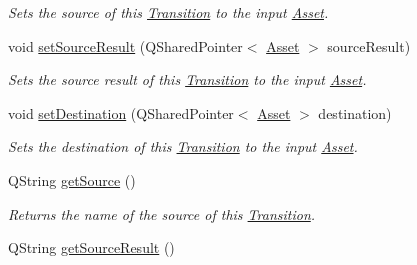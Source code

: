 \begin{DoxyCompactItemize}
\begin{DoxyCompactList}\small\item\em Sets the source of this \hyperlink{class_picto_1_1_transition}{Transition} to the input \hyperlink{class_picto_1_1_asset}{Asset}. \end{DoxyCompactList}\item 
\hypertarget{class_picto_1_1_transition_a9a7d262df965e6324af5e6857fe8347d}{void \hyperlink{class_picto_1_1_transition_a9a7d262df965e6324af5e6857fe8347d}{set\-Source\-Result} (Q\-Shared\-Pointer$<$ \hyperlink{class_picto_1_1_asset}{Asset} $>$ source\-Result)}\label{class_picto_1_1_transition_a9a7d262df965e6324af5e6857fe8347d}

\begin{DoxyCompactList}\small\item\em Sets the source result of this \hyperlink{class_picto_1_1_transition}{Transition} to the input \hyperlink{class_picto_1_1_asset}{Asset}. \end{DoxyCompactList}\item 
\hypertarget{class_picto_1_1_transition_adcac24acae3ce878a91e4569ee429ba0}{void \hyperlink{class_picto_1_1_transition_adcac24acae3ce878a91e4569ee429ba0}{set\-Destination} (Q\-Shared\-Pointer$<$ \hyperlink{class_picto_1_1_asset}{Asset} $>$ destination)}\label{class_picto_1_1_transition_adcac24acae3ce878a91e4569ee429ba0}

\begin{DoxyCompactList}\small\item\em Sets the destination of this \hyperlink{class_picto_1_1_transition}{Transition} to the input \hyperlink{class_picto_1_1_asset}{Asset}. \end{DoxyCompactList}\item 
\hypertarget{class_picto_1_1_transition_a1f50aea4f74f1bf8e340da877165ca1f}{Q\-String \hyperlink{class_picto_1_1_transition_a1f50aea4f74f1bf8e340da877165ca1f}{get\-Source} ()}\label{class_picto_1_1_transition_a1f50aea4f74f1bf8e340da877165ca1f}

\begin{DoxyCompactList}\small\item\em Returns the name of the source of this \hyperlink{class_picto_1_1_transition}{Transition}. \end{DoxyCompactList}\item 
\hypertarget{class_picto_1_1_transition_a5df2e67fb33b66746647cd7b85542d29}{Q\-String \hyperlink{class_picto_1_1_transition_a5df2e67fb33b66746647cd7b85542d29}{get\-Source\-Result} ()}\label{class_picto_1_1_transition_a5df2e67fb33b66746647cd7b85542d29}


\end{DoxyCompactItemize}
